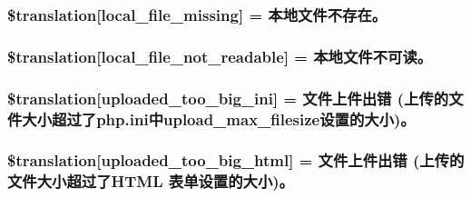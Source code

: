 \subsubsection[{\$translation}]{\setlength{\rightskip}{0pt plus 5cm}\$translation\mbox{[}\textquotesingle{}local\+\_\+file\+\_\+missing\textquotesingle{}\mbox{]} = \textquotesingle{}本地文件不存在。\textquotesingle{}}\label{class_8upload_8zh___c_n_8php_a6ec3d3a47ab70d77e7aa593e82ead10e}
\hypertarget{class_8upload_8zh___c_n_8php_a60104befef9b241f3a7a6a755618a4b3}{}
\subsubsection[{\$translation}]{\setlength{\rightskip}{0pt plus 5cm}\$translation\mbox{[}\textquotesingle{}local\+\_\+file\+\_\+not\+\_\+readable\textquotesingle{}\mbox{]} = \textquotesingle{}本地文件不可读。\textquotesingle{}}\label{class_8upload_8zh___c_n_8php_a60104befef9b241f3a7a6a755618a4b3}
\hypertarget{class_8upload_8zh___c_n_8php_a6a08dcd0d3651fdd098568f6b2f0a42c}{}
\subsubsection[{\$translation}]{\setlength{\rightskip}{0pt plus 5cm}\$translation\mbox{[}\textquotesingle{}uploaded\+\_\+too\+\_\+big\+\_\+ini\textquotesingle{}\mbox{]} = \textquotesingle{}文件上件出错 (上传的文件大小超过了php.\+ini中upload\+\_\+max\+\_\+filesize设置的大小)。\textquotesingle{}}\label{class_8upload_8zh___c_n_8php_a6a08dcd0d3651fdd098568f6b2f0a42c}
\hypertarget{class_8upload_8zh___c_n_8php_a623d5b8b92169f57d7e43458aa911cbb}{}
\subsubsection[{\$translation}]{\setlength{\rightskip}{0pt plus 5cm}\$translation\mbox{[}\textquotesingle{}uploaded\+\_\+too\+\_\+big\+\_\+html\textquotesingle{}\mbox{]} = \textquotesingle{}文件上件出错 (上传的文件大小超过了\+H\+T\+M\+L 表单设置的大小)。\textquotesingle{}}\label{class_8upload_8zh___c_n_8php_a623d5b8b92169f57d7e43458aa911cbb}
\hypertarget{class_8upload_8zh___c_n_8php_a967c17da21b0a2d3bd65cca3a9ca0ea8}{}
